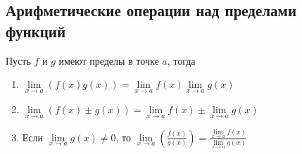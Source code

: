 \documentclass[class=article,a4paper,12pt,crop=false]{standalone}
\begin{document}
\subsection{Арифметические операции над пределами функций}

Пусть $f$ и $g$ имеют пределы в точке $a$, тогда
\begin{enumerate}
  \item {
    $\lim\limits_{x \rightarrow a}(f(x)g(x)) = \lim\limits_{x \rightarrow a}f(x)\lim\limits_{x \rightarrow a}g(x)$
  }
  \item {
    $\lim\limits_{x \rightarrow a}(f(x)\pm g(x)) = \lim\limits_{x \rightarrow a}f(x)\pm\lim\limits_{x \rightarrow a}g(x)$
  }
  \item {
    Если $\lim\limits_{x \rightarrow a}g(x) \neq 0$, то $\lim\limits_{x \rightarrow a}(\frac{f(x)}{g(x)}) = \frac{\lim\limits_{x \rightarrow a}f(x)}{\lim\limits_{x \rightarrow a}g(x)}$
  }
\end{enumerate}
\end{document}
